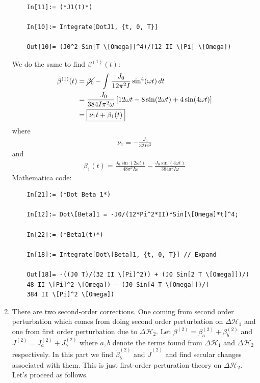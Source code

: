 \documentclass{article}
\theoremstyle{definition}
\newcommand{\ham}{\mathcal{H}}
\newcommand{\be}{\beta}
\newcommand{\f}[2]{\frac{#1}{#2}}
\newcommand{\lb}{\left[}
\newcommand{\rb}{\right]}
\begin{document}
\begin{enumerate}[label=(\alph*)]
\begin{lstlisting}
	In[11]:= (*J1(t)*)
	
	In[10]:= Integrate[DotJ1, {t, 0, T}]
	
	Out[10]= (J0^2 Sin[T \[Omega]]^4)/(12 II \[Pi] \[Omega])
	\end{lstlisting}
	
	
	
	We do the same to find $\be^{(1)}(t)$:
	\begin{align*}
	\be^{(1)}(t) 
	&= \cancel{\be_0} - \int \f{J_0}{12\pi^2 I } \sin^4(\omega t)\,dt \\
	&= {\f{-J_0}{384 I \pi^2 \omega} \lb 12 \omega t  - 8 \sin(2\omega t) + 4\sin (4\omega t)\rb} \\
	&= \boxed{\nu_1 t + \be_1(t)}
	\end{align*}
	where 
	\begin{align*}
	\boxed{\nu_1 = -\f{J_0}{32I \pi^2}}
	\end{align*}
	and 
	\begin{align*}
	\boxed{\be_1(t) = \frac{J_0\sin (2  \omega t)}{48 \pi ^2 I \omega } -\frac{J_0\sin (4\omega t )}{384 \pi ^2 I \omega }}
	\end{align*}
	Mathematica code:
	\begin{lstlisting}
	In[21]:= (*Dot Beta 1*)
	
	In[12]:= Dot\[Beta]1 = -J0/(12*Pi^2*II)*Sin[\[Omega]*t]^4;
	
	In[22]:= (*Beta1(t)*)
	
	In[18]:= Integrate[Dot\[Beta]1, {t, 0, T}] // Expand
	
	Out[18]= -((J0 T)/(32 II \[Pi]^2)) + (J0 Sin[2 T \[Omega]])/(
	48 II \[Pi]^2 \[Omega]) - (J0 Sin[4 T \[Omega]])/(
	384 II \[Pi]^2 \[Omega])
	\end{lstlisting}
	
	\item There are two second-order corrections. One coming from second order perturbation which comes from doing second order perturbation on $\Delta \ham_1$ and one from first order perturbation due to $\Delta \ham_2$. Let $\be^{(2)} = \be_a^{(2)} + \be^{(2)}_b$ and $J^{(2)} = J_a^{(2)} + J^{(2)}_b$ where $a,b$ denote the terms found from $\Delta \ham_1$ and $\Delta \ham_2$ respectively. In this part we find $\dot \be_b^{(2)}$ and $\dot J^{(2)}$ and find secular changes associated with them. This is just first-order perturation theory on $\Delta \ham_2$. Let's proceed as follows. \\
	

\end{enumerate}
\end{document}
